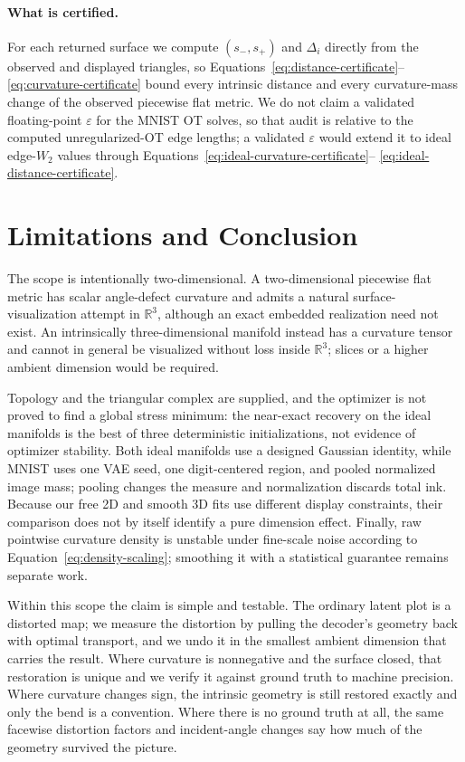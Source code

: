 \paragraph{What is certified.}
For each returned surface we compute $(s_-,s_+)$ and $\Delta_i$ directly from
the observed and displayed triangles, so
Equations~\eqref{eq:distance-certificate}--\eqref{eq:curvature-certificate}
bound every intrinsic distance and every curvature-mass change of the observed
piecewise flat metric.  We do not claim a validated floating-point $\varepsilon$ for the
MNIST OT solves, so that audit is relative to the computed unregularized-OT
edge lengths; a validated $\varepsilon$ would extend it to ideal edge-$W_2$
values through Equations~\eqref{eq:ideal-curvature-certificate}--
\eqref{eq:ideal-distance-certificate}.

\section{Limitations and Conclusion}
\label{sec:conclusion}

The scope is intentionally two-dimensional.  A two-dimensional piecewise flat metric has
scalar angle-defect curvature and admits a natural surface-visualization
attempt in $\mathbb R^3$, although an exact embedded realization need not
exist.  An intrinsically three-dimensional manifold instead has a curvature
tensor and cannot in general be visualized without loss inside $\mathbb R^3$;
slices or a higher ambient dimension would be required.

Topology and the triangular complex are supplied, and the optimizer is not
proved to find a global stress minimum: the near-exact recovery on the ideal
manifolds is
the best of three deterministic initializations, not evidence of optimizer
stability.  Both ideal manifolds use a designed Gaussian identity, while
MNIST uses one VAE seed, one digit-centered region, and pooled normalized
image mass; pooling changes the measure and normalization discards total ink.
Because our free 2D and smooth 3D fits use different display constraints,
their comparison does not by itself identify a pure dimension effect.
Finally, raw pointwise curvature density is unstable under fine-scale noise
according to Equation~\eqref{eq:density-scaling}; smoothing it with a
statistical guarantee remains separate work.

Within this scope the claim is simple and testable.  The ordinary latent plot
is a distorted map; we measure the distortion by pulling the decoder's
geometry back with optimal transport, and we undo it in the smallest ambient
dimension that carries the result.  Where curvature is nonnegative and the
surface closed, that restoration is unique and we verify it against ground
truth to machine precision.  Where curvature changes sign, the intrinsic
geometry is still restored exactly and only the bend is a convention.  Where
there is no ground truth at all, the same facewise distortion factors and
incident-angle changes say how much of the geometry survived the picture.
